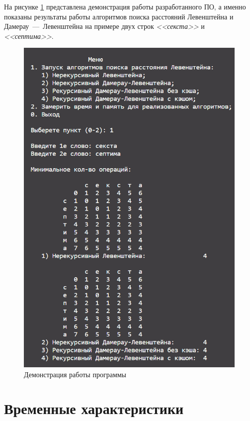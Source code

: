 На рисунке \ref{img:demonstration} представлена демонстрация работы разработанного ПО, а именно показаны результаты работы алгоритмов поиска расстояний Левенштейна и Дамерау~---~Левенштейна на примере двух строк \textit{<<секста>>} и \textit{<<септима>>}.  
\clearpage
\begin{figure}[h]
	\centering
	\includegraphics[height=0.7\textheight]{img/prog_work.png}
	\caption{Демонстрация работы программы}
	\label{img:demonstration}
\end{figure}

\clearpage

\section{Временные характеристики}

